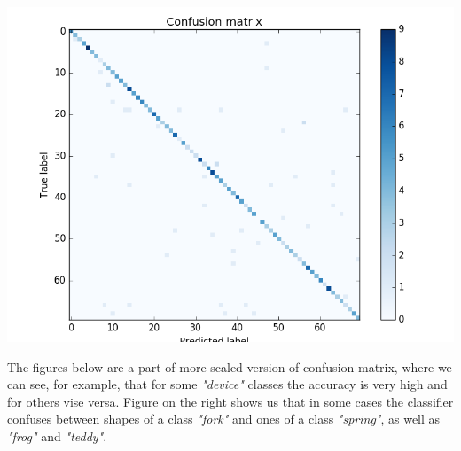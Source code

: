 \documentclass[12pt]{article}
\begin{document}
\includegraphics[scale=0.6]{confusion_matrix.png} 

The figures below are a part of more scaled version of confusion matrix, where we can see, for example, that for some \textit{"device"} classes the accuracy is very high and for others vise versa. Figure on the right shows us that in some cases the classifier confuses between shapes of a class \textit{"fork"} and ones of a class \textit{"spring"}, as well as \textit{"frog"} and \textit{"teddy"}.   
\end{document}

